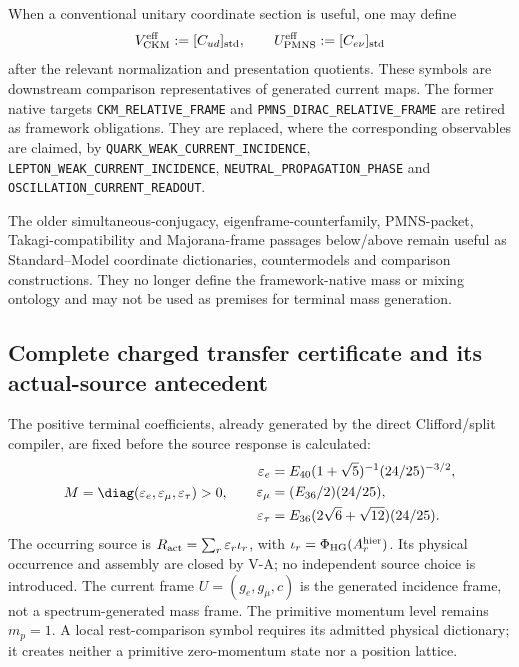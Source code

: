 \documentclass[12pt,a4paper]{article}
\begin{document}
\begin{corollary}
\label{p6:cor:v592-effective-ckm-pmns-dictionary}
When a conventional unitary coordinate section is useful, one may define
\[
 V_{\rm CKM}^{\rm eff}:=[C_{ud}]_{\rm std},\qquad
 U_{\rm PMNS}^{\rm eff}:=[C_{e\nu}]_{\rm std}
\]
after the relevant normalization and presentation quotients.  These symbols
are downstream comparison representatives of generated current maps.  The
former native targets \texttt{CKM\_RELATIVE\_FRAME} and
\texttt{PMNS\_DIRAC\_RELATIVE\_FRAME} are retired as framework obligations.
They are replaced, where the corresponding observables are claimed, by
\texttt{QUARK\_WEAK\_CURRENT\_INCIDENCE},
\texttt{LEPTON\_WEAK\_CURRENT\_INCIDENCE},
\texttt{NEUTRAL\_PROPAGATION\_PHASE} and
\texttt{OSCILLATION\_CURRENT\_READOUT}.
\end{corollary}

\begin{remark}
The older simultaneous-conjugacy, eigenframe-counterfamily, PMNS-packet,
Takagi-compatibility and Majorana-frame passages below/above remain useful as
Standard--Model coordinate dictionaries, countermodels and comparison
constructions.  They no longer define the framework-native mass or mixing
ontology and may not be used as premises for terminal mass generation.
\end{remark}

\subsection{Complete charged transfer certificate and its actual-source antecedent}
\label{p6:sec:v2168-charged-transfer-certificate}
The positive terminal coefficients, already generated by the direct
Clifford/split compiler, are fixed before the source response is calculated:
\[
 M=\diag(\varepsilon_e,\varepsilon_\mu,\varepsilon_\tau)>0,\qquad
 \begin{aligned}
 \varepsilon_e&=E_{40}(1+\sqrt5)^{-1}(24/25)^{-3/2},\\
 \varepsilon_\mu&=(E_{36}/2)(24/25),\\
 \varepsilon_\tau&=E_{36}(2\sqrt6+\sqrt{12})(24/25).
 \end{aligned}
\]
The occurring source is $R_{\rm act}=\sum_r\varepsilon_r\iota_r$,
with $\iota_r=\Phi_{\rm HG}(A_r^{\rm hier})$. Its physical occurrence and
assembly are closed by V-A; no independent source choice is introduced.
The current frame $U=(g_e,g_\mu,c)$ is the generated incidence frame,
not a spectrum-generated mass frame. The primitive momentum level remains
$m_p=1$. A local rest-comparison symbol requires its admitted physical
dictionary; it creates neither a primitive zero-momentum state nor a
position lattice.
\end{document}
